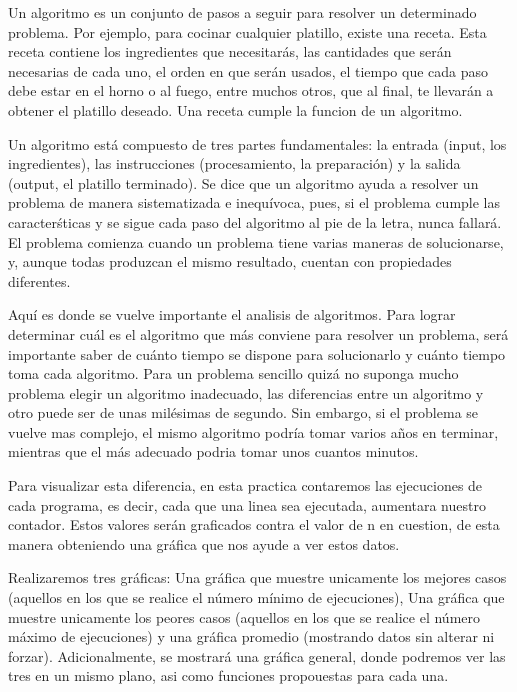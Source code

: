 \documentclass[12pt,twoside]{article}
\begin{document}
Un algoritmo es un conjunto de pasos a seguir para resolver un determinado problema. Por ejemplo, para cocinar cualquier platillo, existe una receta. Esta receta contiene los ingredientes que necesitar\'as, las cantidades que ser\'an necesarias de cada uno, el orden en que ser\'an usados, el tiempo que cada paso debe estar en el horno o al fuego, entre muchos otros, que al final, te llevar\'an a obtener el platillo deseado. Una receta cumple la funcion de un algoritmo.

Un algoritmo est\'a compuesto de tres partes fundamentales: la entrada (input, los ingredientes), las instrucciones (procesamiento, la preparaci\'on) y la salida (output, el platillo terminado). Se dice que un algoritmo ayuda a resolver un problema de manera sistematizada e inequ\'ivoca, pues, si el problema cumple las caracter\'sticas y se sigue cada paso del algoritmo al pie de la letra, nunca fallar\'a. El problema comienza cuando un problema tiene varias maneras de solucionarse, y,  aunque todas produzcan el mismo resultado, cuentan con propiedades diferentes.

\vspace{5mm} %

Aqu\'i es donde se vuelve importante el analisis de algoritmos. Para lograr determinar cu\'al es el algoritmo que m\'as conviene para resolver un problema, ser\'a importante saber de cu\'anto tiempo se dispone para solucionarlo y cu\'anto tiempo toma cada algoritmo. Para un problema sencillo quiz\'a no suponga mucho problema elegir un algoritmo inadecuado, las diferencias entre un algoritmo y otro puede ser de unas mil\'esimas de segundo. Sin embargo, si el problema se vuelve mas complejo, el mismo algoritmo podr\'ia tomar varios años en terminar, mientras que el m\'as adecuado podria tomar unos cuantos minutos.

Para visualizar esta diferencia, en esta practica contaremos las ejecuciones de cada programa, es decir, cada que una linea sea ejecutada, aumentara nuestro contador. Estos valores ser\'an graficados contra el valor de n en cuestion, de esta manera obteniendo una gr\'afica que nos ayude a ver estos datos. 

Realizaremos tres gr\'aficas: Una gr\'afica que muestre unicamente los mejores casos (aquellos en los que se realice el n\'umero m\'inimo de ejecuciones), Una gr\'afica que muestre unicamente los peores casos (aquellos en los que se realice el n\'umero m\'aximo de ejecuciones) y una gr\'afica promedio (mostrando datos sin alterar ni forzar). Adicionalmente, se mostrar\'a una gr\'afica general, donde podremos ver las tres en un mismo plano, asi como funciones propouestas para cada una.
\end{document}
